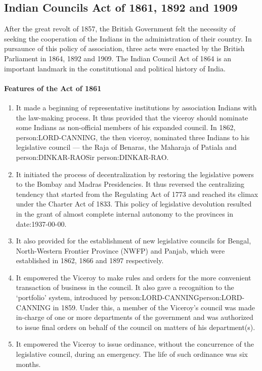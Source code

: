 \subsection{Indian Councils Act of 1861, 1892 and 1909}

After the great revolt of 1857, the British Government felt the necessity of seeking the cooperation of the Indians in the administration of their country. In pursaunce of this policy of association, three acts were enacted by the British Parliament in 1864, 1892 and 1909. The Indian Council Act of 1864 is an important landmark in the constitutional and political history of India.

\paragraph{Features of the Act of 1861}
\begin{enumerate}
  \item It made a beginning of representative institutions by association Indians with the law-making process. It thus provided that the viceroy should nominate some Indians as non-official members of his expanded council. In 1862, \gls{person:LORD-CANNING}, the then viceroy, nominated three Indians to his legislative council — the Raja of Benaras, the Maharaja of Patiala and \gls{person:DINKAR-RAO}Sir \gls{person:DINKAR-RAO}.
  \item It initiated the process of decentralization by restoring the legislative powers to the Bombay and Madras Presidencies. It thus reversed the centralizing tendency that started from the Regulating Act of 1773 and reached its climax under the Charter Act of 1833. This policy of legislative devolution resulted in the grant of almost complete internal autonomy to the provinces in \gls{date:1937-00-00}.
  \item It also provided for the establishment of new legislative councils for Bengal, North-Western Frontier Province (NWFP) and Panjab, which were established in 1862, 1866 and 1897 respectively.
  \item It empowered the Viceroy to make rules and orders for the more convenient transaction of business in the council. It also gave a recognition to the  `portfolio' system, introduced by \gls{person:LORD-CANNING}\gls{person:LORD-CANNING} in 1859. Under this, a member of the Viceroy's council was made in-charge of one or more departments of the government and was authorized to issue final orders on behalf of the council on matters of his department(s).
  \item It empowered the Viceroy to issue ordinance, without the concurrence of the legislative council, during an emergency. The life of such ordinance was six months.
\end{enumerate}

